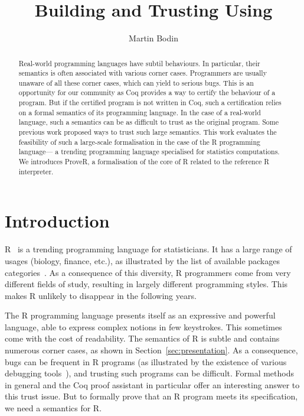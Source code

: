 \documentclass[9pt, sigplan, natbib=false, screen=true]{acmart}
\title{Building and Trusting \R{} Using \Coq{}}
\author{Martin Bodin}
\affiliation{
    \institution{Center of Mathematical Modeling}
    \streetaddress{Beauchef 851}
    \city{Santiago}
    \country{Chile}
}
\newcommand\Coq{Coq}
\newcommand\R{R}
\begin{document}
\begin{abstract}
Real-world programming languages have subtil behaviours.
In particular, their semantics is often associated with
various corner cases.
Programmers are usually unaware of all these corner cases,
which can yield to serious bugs.
This is an opportunity for our community
as \Coq{} provides a way to certify the behaviour of a program.
But if the certified program is not written in \Coq{},
such a certification relies on a formal semantics of its programming language.
In the case of a real-world language, such a semantics
can be as difficult to trust as the original program.
Some previous work proposed ways to trust such large semantics.
This work evaluates the feasibility of such a large-scale formalisation
in the case of the \R{} programming language—%
a trending programming language specialised for statistics computations.
We introduces ProveR, a formalisation of the core of \R{}
related to the reference \R{} interpreter.
\end{abstract}

\maketitle

\section{Introduction}
\label{sec:introduction}

\R{}~\parencite{ihaka1996r, Rwebsite} is a trending
programming language for statisticians.
It has a large range of usages (biology, finance, etc.),
as illustrated by the list of available packages categories~\parencite{rviews}.
As a consequence of this diversity,
\R{} programmers come from very different fields of study,
resulting in largely different programming styles.
This makes \R{} unlikely to disappear
in the following years.

The \R{} programming language presents itself
as an expressive and powerful language,
able to express complex notions in few keystrokes.
This sometimes come with the cost of readability.
The semantics of \R{} is subtle
and contains numerous corner cases,
as shown in Section~\ref{sec:presentation}.
%
As a consequence, bugs can be frequent in \R{} programs
(as illustrated by the existence of various debugging tools~\parencite{mcpherson2014}),
and trusting such programs can be difficult.
Formal methods in general and the \Coq{} proof assistant in particular
offer an interesting answer to this trust issue.
But to formally prove that an \R{} program meets its specification,
we need a semantics for \R{}.
\end{document}
